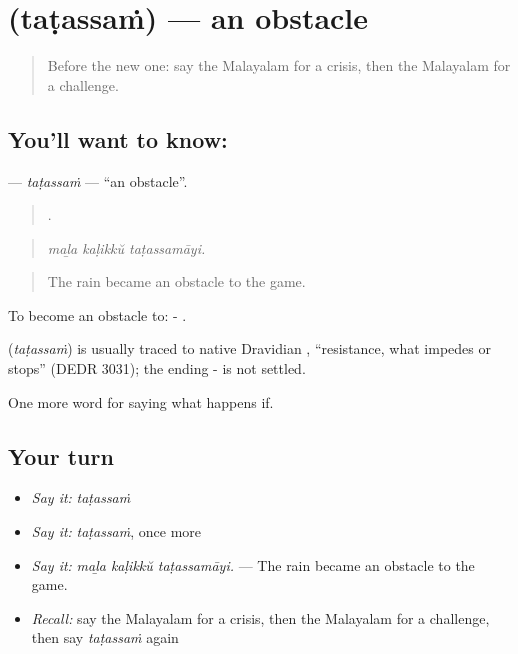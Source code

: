 \section[\texorpdfstring{\ml{തടസ്സം} (taṭassaṁ)}{തടസ്സം (taṭassaṁ)}]{ (taṭassaṁ) — an obstacle}

\label{lesson:ML-C448-tatassam}



\begin{quote}
Before the new one: say the Malayalam for a crisis, then the Malayalam for a challenge.
\end{quote}

\subsection*{You'll want to know: }
\textbf{} — \emph{taṭassaṁ} — \textquotedblleft{}an obstacle\textquotedblright{}.

\begin{quote}
  .
\end{quote}

\begin{quote}
\emph{maḻa kaḷikkŭ taṭassamāyi.}
\end{quote}

\begin{quote}
The rain became an obstacle to the game.
\end{quote}

To become an obstacle to: - .

\begin{cousinweb}
\textbf{} (\emph{taṭassaṁ}) is usually traced to native Dravidian , \textquotedblleft{}resistance, what impedes or stops\textquotedblright{} (DEDR 3031); the ending - is not settled.
\end{cousinweb}

\begin{grammarlens}[title={What you've built}]
One more word for saying what happens if.
\end{grammarlens}

\subsection*{Your turn}
\begin{itemize}
\raggedright
  \item \emph{Say it:} \emph{taṭassaṁ}
  \item \emph{Say it:} \emph{taṭassaṁ}, once more
  \item \emph{Say it:} \emph{maḻa kaḷikkŭ taṭassamāyi.} — The rain became an obstacle to the game.
  \item \emph{Recall:} say the Malayalam for a crisis, then the Malayalam for a challenge, then say \emph{taṭassaṁ} again
\end{itemize}

